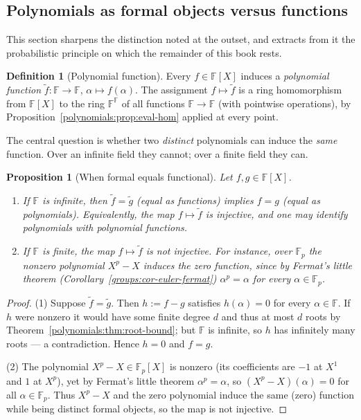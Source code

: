 \documentclass[11pt,a4paper]{article}
\newtheorem{proposition}[theorem]{Proposition}
\theoremstyle{definition}
\newtheorem{definition}[theorem]{Definition}
\theoremstyle{remark}
\newcommand{\F}{\ensuremath{\mathbb{F}}}
\newcommand{\Fp}{\ensuremath{\mathbb{F}_{p}}}
\begin{document}
\subsection{Polynomials as formal objects versus functions}
\label{polynomials:subsec:formal-vs-function}

This section sharpens the distinction noted at the outset, and extracts from it
the probabilistic principle on which the remainder of this book rests.

\begin{definition}[Polynomial function]\label{polynomials:def:poly-function}
Every \(f \in \F[X]\) induces a \emph{polynomial function}
\(\widetilde f \colon \F \to \F\), \(\alpha \mapsto f(\alpha)\). The assignment
\(f \mapsto \widetilde f\) is a ring homomorphism from \(\F[X]\) to the ring
\(\F^\F\) of all functions \(\F \to \F\) (with pointwise operations), by
Proposition~\ref{polynomials:prop:eval-hom} applied at every point.
\end{definition}

The central question is whether two \emph{distinct} polynomials can induce the
\emph{same} function. Over an infinite field they cannot; over a finite field
they can.

\begin{proposition}[When formal equals functional]
\label{polynomials:prop:formal-vs-fn}
Let \(f, g \in \F[X]\).
\begin{enumerate}
  \item If \(\F\) is infinite, then \(\widetilde f = \widetilde g\) (equal as
        functions) implies \(f = g\) (equal as polynomials). Equivalently, the
        map \(f \mapsto \widetilde f\) is injective, and one may identify
        polynomials with polynomial functions.
  \item If \(\F\) is finite, the map \(f \mapsto \widetilde f\) is \emph{not}
        injective. For instance, over \(\Fp\) the nonzero polynomial
        \(X^p - X\) induces the zero function, since by Fermat's little theorem
        (Corollary~\ref{groups:cor-euler-fermat})
        \(\alpha^p = \alpha\) for every \(\alpha \in \Fp\).
\end{enumerate}
\end{proposition}

\begin{proof}
(1) Suppose \(\widetilde f = \widetilde g\). Then \(h := f - g\) satisfies
\(h(\alpha) = 0\) for every \(\alpha \in \F\). If \(h\) were nonzero it would
have some finite degree \(d\) and thus at most \(d\) roots by
Theorem~\ref{polynomials:thm:root-bound}; but \(\F\) is infinite, so \(h\) has
infinitely many roots — a contradiction. Hence \(h = 0\) and \(f = g\).

(2) The polynomial \(X^p - X \in \Fp[X]\) is nonzero (its coefficients are
\(-1\) at \(X^1\) and \(1\) at \(X^p\)), yet by Fermat's little theorem
\(\alpha^p = \alpha\), so \((X^p - X)(\alpha) = 0\) for all \(\alpha \in \Fp\).
Thus \(X^p - X\) and the zero polynomial induce the same (zero) function while
being distinct formal objects, so the map is not injective.
\end{proof}
\end{document}
